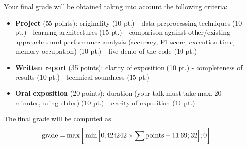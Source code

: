 \documentclass[10pt, conference, letterpaper]{IEEEtran}
\begin{document}
Your final grade will be obtained taking into account the following criteria:
\begin{itemize} 
\item \textbf{Project} (55 points): originality (10 pt.) - data preprocessing techniques (10 pt.) - learning architectures (15 pt.) - comparison against other/existing approaches and performance analysis (accuracy, F1-score, execution time, memory occupation) (10 pt.) - live demo of the code (10 pt.)
\item \textbf{Written report} (35 points): clarity of exposition (10 pt.) - completeness of results (10 pt.) - technical soundness (15 pt.)
\item \textbf{Oral exposition} (20 points): duration (your talk must take max. 20 minutes, using slides) (10 pt.) - clarity of exposition (10 pt.)
\end{itemize}

The final grade will be computed as
\begin{equation}
\textrm{grade} = \max\bigg[\min\Big[0.424242 \times \sum \rm{points} -11.69 ; 32\Big]; 0\bigg]
\end{equation}



\end{document}
